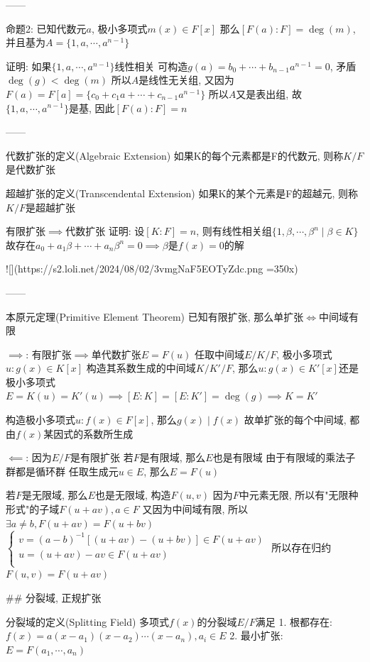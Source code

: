 ------

命题2: 已知代数元$a$, 极小多项式$m(x)\in F[x]$
那么$[F(a):F]=\deg(m)$, 并且基为$A=\{1,a,\cdots,a^{n-1}\}$

证明: 如果$\{1,a,\cdots,a^{n-1}\}$线性相关
可构造$g(a)=b_0+\cdots+b_{n-1}a^{n-1}=0$, 矛盾$\deg(g)<\deg(m)$
所以$A$是线性无关组, 又因为$F(a)=F[a]=\{c_0+c_1a+\cdots+c_{n-1}a^{n-1}\}$
所以$A$又是表出组, 故$\{1,a,\cdots,a^{n-1}\}$是基, 因此$[F(a):F]=n$

------

代数扩张的定义(Algebraic Extension)
如果K的每个元素都是F的代数元, 则称$K/F$是代数扩张

超越扩张的定义(Transcendental Extension)
如果K的某个元素是F的超越元, 则称$K/F$是超越扩张

有限扩张$\implies$代数扩张
证明: 设$[K:F]=n$, 则有线性相关组$\{1,\beta,\cdots,\beta^n\mid\beta\in K\}$
故存在$a_0+a_1\beta+\cdots+a_n\beta^n=0\implies\beta$是$f(x)=0$的解

![](https://s2.loli.net/2024/08/02/3vmgNaF5EOTyZdc.png =350x)


------

本原元定理(Primitive Element Theorem)
已知有限扩张, 那么单扩张$\iff$中间域有限

$\implies$: 有限扩张$\implies$单代数扩张$E=F(u)$
任取中间域$E/K/F$, 极小多项式$u:g(x)\in K[x]$
构造其系数生成的中间域$K/K'/F$, 那么$u:g(x)\in K'[x]$还是极小多项式
$E=K(u)=K'(u)\implies[E:K]=[E:K']=\deg(g)\implies K=K'$

构造极小多项式$u:f(x)\in F[x]$, 那么$g(x)\mid f(x)$
故单扩张的每个中间域, 都由$f(x)$某因式的系数所生成

$\impliedby$: 因为$E/F$是有限扩张
若$F$是有限域, 那么$E$也是有限域
由于有限域的乘法子群都是循环群
任取生成元$u\in E$, 那么$E=F(u)$

若$F$是无限域, 那么$E$也是无限域, 构造$F(u,v)$
因为$F$中元素无限, 所以有"无限种形式"的子域$F(u+av),a\in F$
又因为中间域有限, 所以$\exists a\neq b,F(u+av)=F(u+bv)$
$\begin{cases}
    v=(a-b)^{-1}[(u+av)-(u+bv)]\in F(u+av) \\
    u=(u+av)-av\in F(u+av) \\
\end{cases}$
所以存在归约$F(u,v)=F(u+av)$


## 分裂域, 正规扩张

分裂域的定义(Splitting Field)
多项式$f(x)$的分裂域$E/F$满足
1. 根都存在: $f(x)=a(x-a_1)(x-a_2)\cdots(x-a_n),a_i\in E$
2. 最小扩张: $E=F(a_1,\cdots,a_n)$

